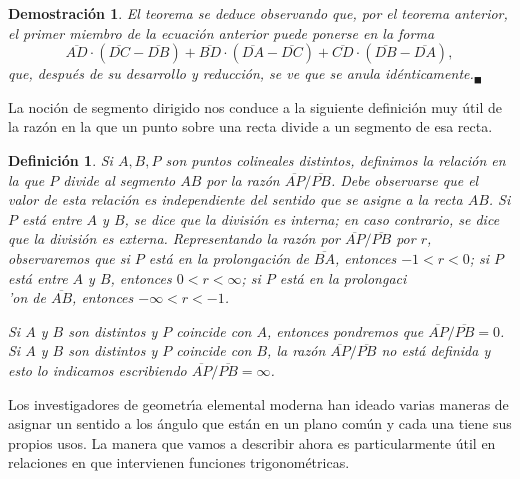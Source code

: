 \documentclass[a4paper,11pt]{article}
\theoremstyle{teoremas}
\theoremstyle{ejemplos}
\theoremstyle{definiciones}
\theoremstyle{lemas}
\newtheorem*{definicion}{Definici\'on}
\newtheorem*{demostracion}{Demostraci\'on}
\begin{document}
\begin{demostracion}
 El teorema se deduce observando que, por el teorema anterior, el primer miembro de la ecuaci\'on anterior puede ponerse en la forma
 \begin{equation*}
  \overline{AD}\cdot\left( \overline{DC} - \overline{DB} \right) + \overline{BD}\cdot\left( \overline{DA} - \overline{DC} \right) + \overline{CD}\cdot \left( \overline{DB}  - \overline{DA} \right),
 \end{equation*}
 que, despu\'es de su desarrollo y reducci\'on, se ve que se anula id\'enticamente.${}_{\blacksquare}$
\end{demostracion}

La noci\'on de segmento dirigido nos conduce a la siguiente definici\'on muy \'util de la raz\'on en la que un punto sobre una recta divide a un segmento de esa recta.

\begin{definicion}
 Si $A, B, P$ son puntos colineales distintos, definimos \textit{la relaci\'on en la que} $P$ \textit{divide al segmento} $AB$ por la raz\'on $\overline{AP}/\overline{PB}$. Debe observarse que el valor de esta relaci\'on es independiente del sentido que se asigne a la recta $AB$. Si $P$ est\'a entre $A$ y $B$, se dice que la divisi\'on es \textit{interna}; en caso contrario, se dice que la divisi\'on es \textit{externa}. Representando la raz\'on por $\overline{AP}/\overline{PB}$ por $r$, observaremos que si $P$ est\'a en la prolongaci\'on de $\overline{BA}$, entonces $-1 < r < 0$; si $P$ est\'a entre $A$ y $B$, entonces $0 < r < \infty$; si $P$ est\'a en la prolongaci\\'on de $\overline{AB}$, entonces $-\infty < r < -1$.
 \par 
 Si $A$ y $B$ son distintos y $P$ coincide con $A$, entonces pondremos que $\overline{AP}/\overline{PB} = 0$. Si $A$ y $B$ son distintos y $P$ coincide con $B$, la raz\'on $\overline{AP}/\overline{PB}$ no est\'a definida y esto lo indicamos escribiendo $\overline{AP}/\overline{PB} = \infty$.
\end{definicion}

Los investigadores de geometr\'{\i}a elemental moderna han ideado varias maneras de asignar un sentido a los \'angulo que est\'an en un plano com\'un y cada una tiene sus propios usos. La manera que vamos a describir ahora es particularmente \'util en relaciones en que intervienen funciones trigonom\'etricas.
\end{document}
